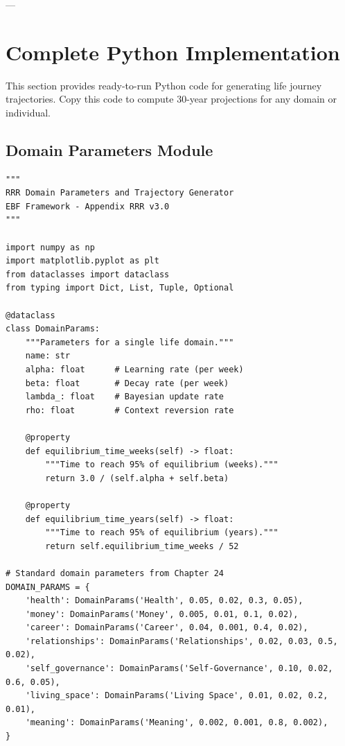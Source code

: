 ---


\section{Complete Python Implementation}
\label{rrr:python}

\begin{tcolorbox}[colback=blue!5!white, colframe=blue!75!black, title=Purpose]
This section provides ready-to-run Python code for generating life journey trajectories.
Copy this code to compute 30-year projections for any domain or individual.
\end{tcolorbox}

\subsection{Domain Parameters Module}

\begin{verbatim}
"""
RRR Domain Parameters and Trajectory Generator
EBF Framework - Appendix RRR v3.0
"""

import numpy as np
import matplotlib.pyplot as plt
from dataclasses import dataclass
from typing import Dict, List, Tuple, Optional

@dataclass
class DomainParams:
    """Parameters for a single life domain."""
    name: str
    alpha: float      # Learning rate (per week)
    beta: float       # Decay rate (per week)
    lambda_: float    # Bayesian update rate
    rho: float        # Context reversion rate

    @property
    def equilibrium_time_weeks(self) -> float:
        """Time to reach 95% of equilibrium (weeks)."""
        return 3.0 / (self.alpha + self.beta)

    @property
    def equilibrium_time_years(self) -> float:
        """Time to reach 95% of equilibrium (years)."""
        return self.equilibrium_time_weeks / 52

# Standard domain parameters from Chapter 24
DOMAIN_PARAMS = {
    'health': DomainParams('Health', 0.05, 0.02, 0.3, 0.05),
    'money': DomainParams('Money', 0.005, 0.01, 0.1, 0.02),
    'career': DomainParams('Career', 0.04, 0.001, 0.4, 0.02),
    'relationships': DomainParams('Relationships', 0.02, 0.03, 0.5, 0.02),
    'self_governance': DomainParams('Self-Governance', 0.10, 0.02, 0.6, 0.05),
    'living_space': DomainParams('Living Space', 0.01, 0.02, 0.2, 0.01),
    'meaning': DomainParams('Meaning', 0.002, 0.001, 0.8, 0.002),
}
\end{verbatim}

